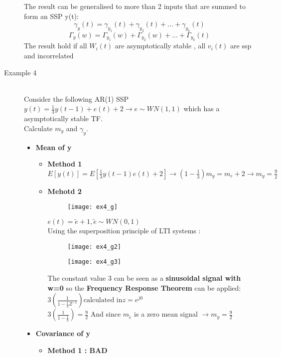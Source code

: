 \begin{description}
\begin{itemize}
\[\]
\end{itemize}
The result can be generalised to more than 2 inputs that are summed to form an SSP y(t): 
\[
\boxed{\gamma_y(t)= \gamma_{y_1}(t) + \gamma_{y_2}(t) +...+ \gamma_{y_k}(t) }
\]
\[
\boxed{\Gamma_y(w)= \Gamma_{y_1}(w) + \Gamma_{y_2}(w) +...+ \Gamma_{y_k}(t) }
\]
The result hold if all $W_i(t)$ are asymptotically stable , all $v_i(t)$ are ssp and incorrelated
\item[Example 4]\hfill\\
Consider the following AR(1) SSP $y(t) = \frac{1}{3}y(t-1)+e(t)+2 \to e \sim WN(1,1)$
which has a asymptotically stable TF.\\
Calculate $m_y$ and $\gamma_y$.\\
\begin{itemize}
\item \textbf{Mean of y}\\
\begin{itemize}
\item \textbf{Method 1}\\
$E[y(t)] = E[\frac{1}{3}y(t-1)e(t)+2] \to (1-\frac{1}{3})m_y = m_e+2 \to m_y = \frac{9}{2}$
\item \textbf{Mehotd 2}\\
\begin{figure}[H]
 \centering
  \texttt{[image: ex4\_g]}
\end{figure}
$e(t) = \tilde{e} +1 , \tilde{e} \sim WN(0,1)$\\
Using the superposition principle of LTI systems :
\begin{figure}[H]
 \centering
  \texttt{[image: ex4\_g2]}
\end{figure}
\begin{figure}[H]
 \centering
  \texttt{[image: ex4\_g3]}
\end{figure}
The constant value 3 can be seen as a \textbf{sinusoidal signal with w=0} so the \textbf{Frequency Response Theorem } can be applied: \\
$ 3(\frac{1}{1-\frac{1}{3}Z^{-1}}) \text{calculated in} z=e^{j0}$ \\
$ 3(\frac{1}{1-\frac{1}{3}}) = \frac{9}{2}$
And since $m_{\tilde{e}}$ is a zero mean signal $\to m_y = \frac{9}{2}$
\end{itemize}
\item \textbf{Covariance of y}\\
\begin{itemize}
\item \textbf{Method 1 : BAD}\\

\end{itemize}
\end{itemize}
\end{description}

